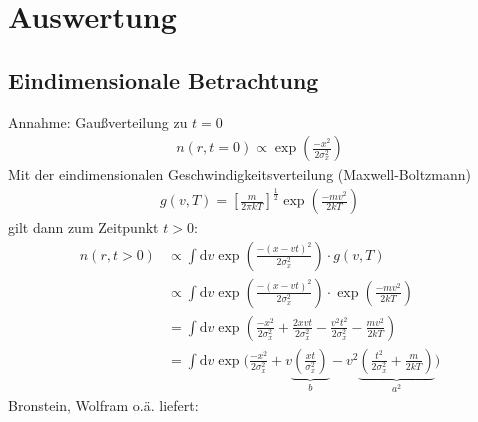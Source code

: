 \documentclass[10pt,a4paper]{extarticle}
\begin{document}
\newpage
\section*{Auswertung}
\subsection*{Eindimensionale Betrachtung}
Annahme: Gaußverteilung zu $t = 0$
\begin{align}
n(r, t= 0) \varpropto \exp\left(\frac{-x^2}{2 \sigma_x^2}\right)
\end{align}
Mit der eindimensionalen Geschwindigkeitsverteilung (Maxwell-Boltzmann) 
\begin{align}
g(v,T) = \left[\frac{m}{2 \pi k T}\right]^{\frac{1}{2}} \exp \left(\frac{-mv^2}{2kT}\right)
\end{align}
gilt dann zum Zeitpunkt $t>0$:
\begin{align}
n(r, t> 0) &\varpropto \int \mathrm{d}v \exp\left(\frac{-(x-vt)^2}{2 \sigma_x^2}\right) \cdot g(v,T) \\
&\varpropto \int \mathrm{d}v \exp\left(\frac{-(x-vt)^2}{2 \sigma_x^2}\right) \cdot \exp \left(\frac{-mv^2}{2kT}\right) \label{eq:falt} \\
&= \int \mathrm{d}v \exp\left(\frac{-x^2}{2 \sigma_x^2} + \frac{2xvt}{2 \sigma_x^2} - \frac{v^2 t^2}{2 \sigma_x^2} - \frac{mv^2}{2kT}\right) \\
&= \int \mathrm{d}v \exp\biggl(\frac{-x^2}{2 \sigma_x^2} + v \underbrace{\left( \frac{xt}{\sigma_x^2}\right)}_{b} - v^2 \underbrace{\left(\frac{t^2}{2 \sigma_x^2} + \frac{m}{2kT} \right)}_{a^2}\biggr) 
\end{align}
Bronstein, Wolfram o.ä. liefert:
\end{document}
